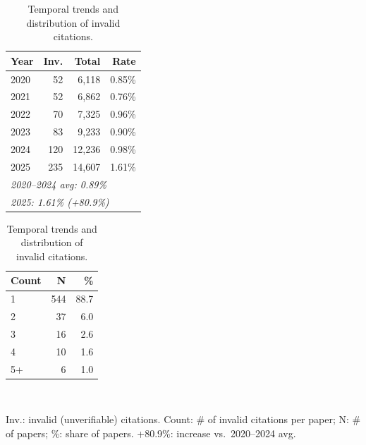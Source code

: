 \begin{table}[t]
\caption{Temporal trends and distribution of invalid citations.}
\label{tab:temporal_and_per_paper}
\centering
\begin{minipage}[t]{0.5\columnwidth}
\centering
{}
\label{tab:temporal_trends}
\vspace{1mm}
\small
{}
\begin{tabular}{lrrr}
\toprule
\textbf{Year} & \cellcolor{red!12}\textbf{Inv.} & \cellcolor{blue!12}\textbf{Total} & \cellcolor{red!12}\textbf{Rate} \\
\midrule
2020 & \cellcolor{red!6}52 & \cellcolor{blue!8}6,118 & \cellcolor{red!8}0.85\% \\
2021 & \cellcolor{red!6}52 & \cellcolor{blue!10}6,862 & \cellcolor{red!6}0.76\% \\
2022 & \cellcolor{red!8}70 & \cellcolor{blue!12}7,325 & \cellcolor{red!10}0.96\% \\
2023 & \cellcolor{red!10}83 & \cellcolor{blue!18}9,233 & \cellcolor{red!8}0.90\% \\
2024 & \cellcolor{red!14}120 & \cellcolor{blue!24}12,236 & \cellcolor{red!10}0.98\% \\
2025 & \cellcolor{red!22}235 & \cellcolor{blue!30}14,607 & \cellcolor{red!22}1.61\% \\
\midrule
\multicolumn{4}{l}{\textit{2020--2024 avg: 0.89\%}} \\
\multicolumn{4}{l}{\textit{2025: 1.61\% \textcolor{red!88}{(+80.9\%)}}} \\
\bottomrule
\end{tabular}
\end{minipage}%
\hfill
\begin{minipage}[t]{0.5\columnwidth}
\centering
{}
\label{tab:invalid_per_paper}
\vspace{1mm}
\small
\begin{tabular}{lrr}
\toprule
\cellcolor{red!12}\textbf{Count} & \cellcolor{red!12}\textbf{N} & \cellcolor{red!12}\textbf{\%} \\
\midrule
\cellcolor{red!10}1 & \cellcolor{red!10}544 & \cellcolor{red!10}88.7 \\
\cellcolor{red!20}2 & \cellcolor{red!20}37 & \cellcolor{red!20}6.0 \\
\cellcolor{red!30}3 & \cellcolor{red!30}16 & \cellcolor{red!30}2.6 \\
\cellcolor{red!40}4 & \cellcolor{red!40}10 & \cellcolor{red!40}1.6 \\
\cellcolor{red!50}5+ & \cellcolor{red!50}6 & \cellcolor{red!50}1.0 \\
\bottomrule
\end{tabular}
\end{minipage}\\[0.5em]
\raggedright\footnotesize{Inv.: invalid (unverifiable) citations. Count: \# of invalid citations per paper; N: \# of papers; \%: share of papers. +80.9\%: increase vs.\ 2020--2024 avg.}
\end{table}

